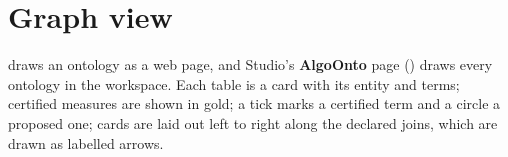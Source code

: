 \section{Graph view}

 draws an ontology as a web page, and Studio's \textbf{AlgoOnto\texttrademark} page () draws every ontology in the workspace. Each table is a card with its entity and terms; certified measures are shown in gold; a tick marks a certified term and a circle a proposed one; cards are laid out left to right along the declared joins, which are drawn as labelled arrows.
